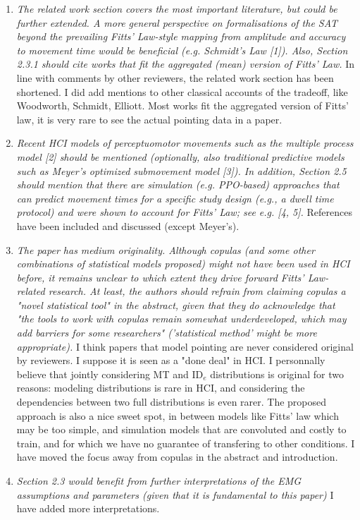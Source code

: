\documentclass{article}
\begin{document}
\begin{enumerate}
    \item \textit{The related work section covers the most important literature, but could be further extended. A more general perspective on formalisations of the SAT beyond the prevailing Fitts' Law-style mapping from amplitude and accuracy to movement time would be beneficial (e.g. Schmidt's Law [1]). Also, Section 2.3.1 should cite works that fit the aggregated (mean) version of Fitts' Law.} In line with comments by other reviewers, the related work section has been shortened. I did add mentions to other classical accounts of the tradeoff, like Woodworth, Schmidt, Elliott. Most works fit the aggregated version of Fitts' law, it is very rare to see the actual pointing data in a paper.
    \item \textit{Recent HCI models of perceptuomotor movements such as the multiple process model [2] should be mentioned (optionally, also traditional predictive models such as Meyer's optimized submovement model [3]). In addition, Section 2.5 should mention that there are simulation (e.g. PPO-based) approaches that can predict movement times for a specific study design (e.g., a dwell time protocol) and were shown to account for Fitts' Law; see e.g. [4, 5].} References have been included and discussed (except Meyer's).
    \item \textit{The paper has medium originality. Although copulas (and some other combinations of statistical models proposed) might not have been used in HCI before, it remains unclear to which extent they drive forward Fitts' Law-related research. At least, the authors should refrain from claiming copulas a "novel statistical tool" in the abstract, given that they do acknowledge that "the tools to work with copulas remain somewhat underdeveloped, which may add barriers for some researchers" ('statistical method' might be more appropriate).} I think papers that model pointing are never considered original by reviewers. I suppose it is seen as a "done deal" in HCI. I personnally believe that jointly considering MT and ID$_e$ distributions is original for two reasons: modeling distributions is rare in HCI, and considering the dependencies between two full distributions is even rarer. The proposed approach is also a nice sweet spot, in between models like Fitts' law which may be too simple, and simulation models that are convoluted and costly to train, and for which we have no guarantee of transfering to other conditions. I have moved the focus away from copulas in the abstract and introduction.
    \item \textit{Section 2.3 would benefit from further interpretations of the EMG assumptions and parameters (given that it is fundamental to this paper)} I have added more interpretations.

\end{enumerate}
\end{document}

